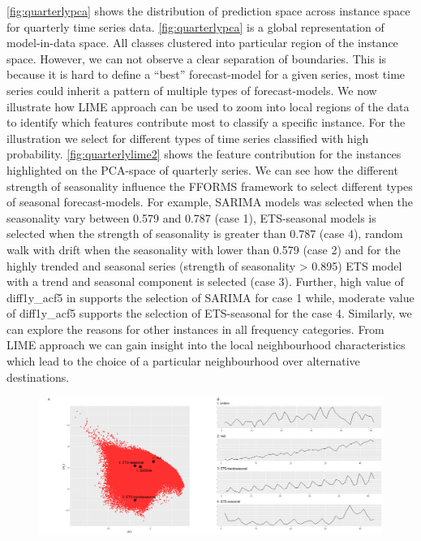 \documentclass[11pt,a4paper,]{article}
\begin{document}
\autoref{fig:quarterlypca} shows the distribution of prediction space
across instance space for quarterly time series data.
\autoref{fig:quarterlypca} is a global representation of model-in-data
space. All classes clustered into particular region of the instance
space. However, we can not observe a clear separation of boundaries.
This is because it is hard to define a ``best'' forecast-model for a
given series, most time series could inherit a pattern of multiple types
of forecast-models. We now illustrate how LIME approach can be used to
zoom into local regions of the data to identify which features
contribute most to classify a specific instance. For the illustration we
select for different types of time series classified with high
probability. \autoref{fig:quarterlylime2} shows the feature contribution
for the instances highlighted on the PCA-space of quarterly series. We
can see how the different strength of seasonality influence the FFORMS
framework to select different types of seasonal forecast-models. For
example, SARIMA models was selected when the seasonality vary between
0.579 and 0.787 (case 1), ETS-seasonal models is selected when the
strength of seasonality is greater than 0.787 (case 4), random walk with
drift when the seasonality with lower than 0.579 (case 2) and for the
highly trended and seasonal series (strength of seasonality
\textgreater{} 0.895) ETS model with a trend and seasonal component is
selected (case 3). Further, high value of diff1y\_acf5 in supports the
selection of SARIMA for case 1 while, moderate value of diff1y\_acf5
supports the selection of ETS-seasonal for the case 4. Similarly, we can
explore the reasons for other instances in all frequency categories.
From LIME approach we can gain insight into the local neighbourhood
characteristics which lead to the choice of a particular neighbourhood
over alternative destinations.

\begin{figure}[h]

{\centering \includegraphics{figures/quarterlylime-1} 

}

\end{figure}
\end{document}
